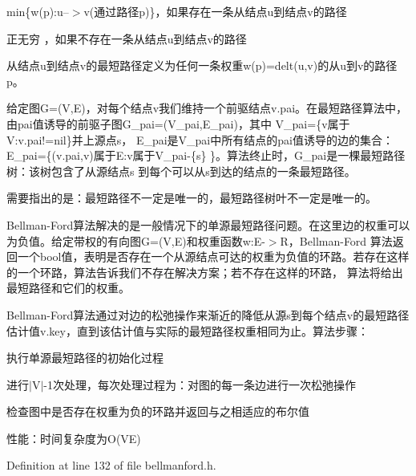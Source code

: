 \begin{DoxyItemize}
\item min\{w(p)\+:u--$>$v(通过路径p)\}，如果存在一条从结点u到结点v的路径
\item 正无穷 ，如果不存在一条从结点u到结点v的路径
\end{DoxyItemize}

从结点u到结点v的最短路径定义为任何一条权重w(p)=delt(u,v)的从u到v的路径p。

给定图\+G=(V,E)，对每个结点v我们维持一个前驱结点v.\+pai。在最短路径算法中，由pai值诱导的前驱子图\+G\+\_\+pai=(V\+\_\+pai,E\+\_\+pai)，其中 V\+\_\+pai=\{v属于\+V\+:v.\+pai!=nil\}并上源点s， E\+\_\+pai是\+V\+\_\+pai中所有结点的pai值诱导的边的集合：\+E\+\_\+pai=\{(v.\+pai,v)属于\+E\+:v属于\+V\+\_\+pai-\/\{s\} \}。算法终止时，\+G\+\_\+pai是一棵最短路径树：该树包含了从源结点s 到每个可以从s到达的结点的一条最短路径。

需要指出的是：最短路径不一定是唯一的，最短路径树叶不一定是唯一的。

Bellman-\/\+Ford算法解决的是一般情况下的单源最短路径问题。在这里边的权重可以为负值。给定带权的有向图\+G=(V,E)和权重函数w\+:E-\/$>$R，\+Bellman-\/\+Ford 算法返回一个bool值，表明是否存在一个从源结点可达的权重为负值的环路。若存在这样的一个环路，算法告诉我们不存在解决方案；若不存在这样的环路， 算法将给出最短路径和它们的权重。

Bellman-\/\+Ford算法通过对边的松弛操作来渐近的降低从源s到每个结点v的最短路径估计值v.key，直到该估计值与实际的最短路径权重相同为止。算法步骤：


\begin{DoxyItemize}
\item 执行单源最短路径的初始化过程
\item 进行$\vert$\+V$\vert$-\/1次处理，每次处理过程为：对图的每一条边进行一次松弛操作
\item 检查图中是否存在权重为负的环路并返回与之相适应的布尔值
\end{DoxyItemize}

性能：时间复杂度为\+O(\+V\+E) 

Definition at line 132 of file bellmanford.\+h.

\hypertarget{namespace_introduction_to_algorithm_1_1_graph_algorithm_a9c57b397479972f84b4b10bc19968297}{}
